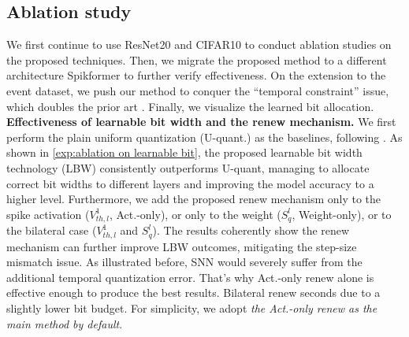 \subsection{Ablation study}
\label{sbsec:ablation}
We first continue to use ResNet20 and CIFAR10 to conduct ablation studies on the proposed techniques. Then, we migrate the proposed method to a different architecture Spikformer \cite{zhou2022spikformer} to further verify  effectiveness. On the extension to the event dataset, we push our method to conquer the “temporal constraint” issue, which doubles the prior art \cite{shen2024conventional}. 
Finally, we visualize the learned bit allocation. 
\\\textbf{Effectiveness of learnable bit width and the renew mechanism.} 
We first perform the plain uniform quantization (U-quant.) as the baselines, following  \cite{shen2024conventional}. As shown in \cref{exp:ablation on learnable bit}, the proposed learnable bit width technology (LBW) consistently outperforms U-quant, managing to allocate correct bit widths to different layers and improving the model accuracy to a higher level. Furthermore, we add the proposed renew mechanism only to the spike activation ($V_{th,l}^1$, Act.-only), or only to the weight ($S_q^l$, Weight-only), or to the bilateral case ($V_{th,l}^1$ and $S_q^l$). The results coherently show the renew mechanism can further improve LBW outcomes, mitigating the step-size mismatch issue.
As illustrated before, SNN would severely  suffer from the additional temporal quantization error. That's why Act.-only renew alone is effective enough to produce the best results. Bilateral renew seconds due to  a slightly lower bit budget. For simplicity, we adopt \emph{the 
Act.-only renew as the main method by default}.
